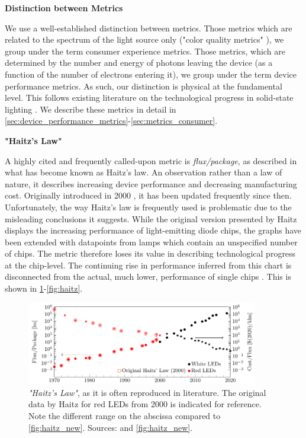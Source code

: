 \documentclass[parskip=full]{article}
\begin{document}
\textbf{Distinction between Metrics}

We use a well-established distinction between metrics. Those metrics which are related to the spectrum of the light source only ("color quality metrics" \cite{DLC_SSL_Requirements}\cite{dilaura2011lighting}), we group under the term consumer experience metrics. Those metrics, which are determined by the number and energy of photons leaving the device (as a function of the number of electrons entering it), we group under the term device performance metrics. As such, our distinction is physical at the fundamental level. This follows existing literature on the technological progress in solid-state lighting \cite{tsao2010solid}. We describe these metrics in detail in \cref{sec:device_performance_metrics}-\cref{sec:metrics_consumer}.

\textbf{"Haitz's Law"}

A highly cited and frequently called-upon metric is \textit{flux/package}, as described in what has become known as Haitz's law. An observation rather than a law of nature, it describes increasing device performance and decreasing manufacturing cost. Originally introduced in 2000 \cite{haitz1999case}, it has been updated frequently since then. Unfortunately, the way Haitz's law is frequently used is  problematic due to the misleading conclusions it suggests. While the original version presented by Haitz displays the increasing performance of light-emitting diode chips, the graphs have been extended with datapoints from lamps which contain an unspecified number of chips. The metric therefore loses its value in describing technological progress at the chip-level. The continuing rise in performance inferred from this chart is disconnected from the actual, much lower, performance of single chips \cite{weinold2021compound}. This is shown in \cref{fig:haitz-org}-\cref{fig:haitz}.

\begin{figure}[h!]
\vspace{-10mm}
    \includegraphics[width=0.9\textwidth]{./figures/haitz_law_old_both.pdf}
    \caption{\textit{"Haitz's Law"}, as it is often reproduced in literature. The original data by Haitz for red LEDs from 2000 is indicated for reference. Note the different range on the abscissa compared to \cref{fig:haitz_new}. Sources: \cite{haitz1999case}\cite{haitz2011solid} and  \cref{fig:haitz_new}.}
    \label{fig:haitz-org}
\end{figure}
\end{document}
